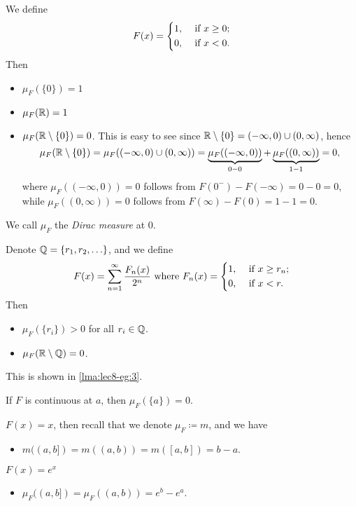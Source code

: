 \begin{eg}
	We define
	\[
		F(x) = \begin{dcases}
			1, & \text{ if } x\geq 0 ; \\
			0, & \text{ if } x<0.
		\end{dcases}
	\]
	Then
	\begin{itemize}
		\item \(\mu _F(\{0\})=1\)
		\item \(\mu _F(\mathbb{\MakeUppercase{r}} ) = 1\)
		\item \(\mu _F(\mathbb{\MakeUppercase{r}}\setminus \{0\} ) = 0\). This is easy to see since \(\mathbb{\MakeUppercase{r}} \setminus \{0\} = (-\infty , 0)\cup (0, \infty )\), hence
		      \[
			      \mu _F(\mathbb{\MakeUppercase{r}} \setminus \{0\}) = \mu _F((-\infty , 0)\cup (0, \infty ))
			      = \underbrace{\mu _F((-\infty , 0))}_{0 - 0} + \underbrace{\mu _F((0, \infty ))}_{1 -1 }= 0,
		      \]
		      where \(\mu _{F} ((-\infty , 0)) = 0\) follows from \(F(0^-) - F(-\infty ) = 0 - 0 = 0\), while
		      \(\mu _{F} ((0, \infty ))=0\) follows from \(F(\infty ) - F(0) = 1 - 1 = 0\).
	\end{itemize}
	We call \(\mu _F\) the \emph{Dirac measure} at \(0\).
\end{eg}
\begin{eg}\label{eg:lec8-3}
	Denote \(\mathbb{\MakeUppercase{q}} = \{r_1, r_2, \ldots  \}\), and we define
	\[
		F(x) = \sum\limits_{n=1}^{\infty} \frac{F_n(x)}{2^n} \text{ where }  F_{n}(x) = \begin{dcases}
			1, & \text{ if } x\geq r_n; \\
			0, & \text{ if } x<r.       \\
		\end{dcases}
	\]
	Then
	\begin{itemize}
		\item \(\mu _F(\{r_{i}\})>0\) for all \(r_{i}\in\mathbb{\MakeUppercase{q}} \).
		\item \(\mu _F(\mathbb{\MakeUppercase{r}} \setminus \mathbb{\MakeUppercase{q}} ) = 0\).
	\end{itemize}
	This is shown in \autoref{lma:lec8-eg:3}.
\end{eg}
\begin{eg}
	If \(F\) is continuous at \(a\), then \(\mu _F(\{a\}) = 0\).
\end{eg}
\begin{eg}
	\(F(x) = x\), then recall that we denote \(\mu _F \coloneqq m\), and we have
	\begin{itemize}
		\item \( m((a, b]) = m((a, b)) = m([a, b]) = b - a\).
	\end{itemize}
\end{eg}
\begin{eg}
	\(F(x) = e^x\)
	\begin{itemize}
		\item \(\mu _F((a, b]) = \mu _F((a, b)) = e^b - e^a\).
	\end{itemize}
\end{eg}

